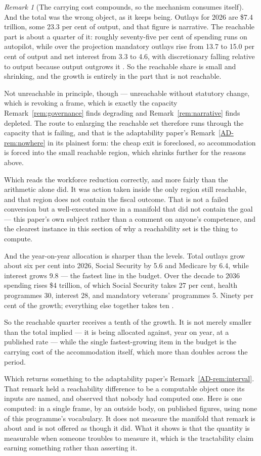 \documentclass[11pt,a4paper]{article}
\theoremstyle{remark}
\newtheorem{remark}[definition]{Remark}
\begin{document}
\begin{remark}[The carrying cost compounds, so the mechanism consumes itself]
And the total was the wrong object, as it keeps being. Outlays for 2026 are \$7.4 trillion, some
23.3 per cent of output, and that figure is narrative. The reachable part is about a quarter of
it: roughly seventy-five per cent of spending runs on autopilot, while over the projection mandatory
outlays rise from 13.7 to 15.0 per cent of output and net interest from 3.3 to 4.6, with discretionary
falling relative to output because output outgrows it \citep{cbo2026}. So the reachable share is
small and shrinking, and the growth is entirely in the part that is not reachable.

Not unreachable in principle, though --- unreachable without statutory change, which is revoking a
frame, which is exactly the capacity Remark~\ref{rem:governance} finds degrading and
Remark~\ref{rem:narrative} finds depleted. The route to enlarging the reachable set therefore runs
through the capacity that is failing, and that is the adaptability paper's Remark~\ref{AD-rem:nowhere} in its plainest form: the
cheap exit is foreclosed, so accommodation is forced into the small reachable region, which shrinks
further for the reasons above.

Which reads the workforce reduction correctly, and more fairly than the arithmetic alone did. It
was action taken inside the only region still reachable, and that region does not contain the fiscal
outcome. That is not a failed conversion but a well-executed move in a manifold that did not
contain the goal --- this paper's own subject rather than a comment on anyone's competence, and the
clearest instance in this section of why a reachability set is the thing to compute.

And the year-on-year allocation is sharper than the levels. Total outlays grow about six per cent
into 2026, Social Security by 5.6 and Medicare by 6.4, while interest grows 9.8 --- the fastest line in
the budget. Over the decade to 2036 spending rises \$4 trillion, of which Social Security takes 27 per
cent, health programmes 30, interest 28, and mandatory veterans' programmes 5. Ninety per cent of
the growth; everything else together takes ten \citep{crfb2026}.

So the reachable quarter receives a tenth of the growth. It is not merely smaller than the total
implied --- it is being allocated against, year on year, at a published rate --- while the single
fastest-growing item in the budget is the carrying cost of the accommodation itself, which more than
doubles across the period.

Which returns something to the adaptability paper's Remark~\ref{AD-rem:interval}. That remark held a reachability difference
to be a computable object once its inputs are named, and observed that nobody had computed one.
Here is one computed: in a single frame, by an outside body, on published figures, using none of
this programme's vocabulary. It does not measure the manifold that remark is about and is not offered as
though it did. What it shows is that the quantity is measurable when someone troubles to measure
it, which is the tractability claim earning something rather than asserting it.


\end{remark}
\end{document}
